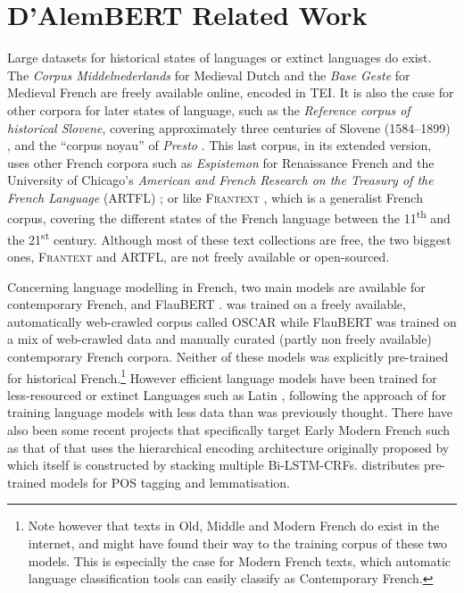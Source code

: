 \chapter{D'AlemBERT Related Work}


Large datasets for historical states of languages or  extinct languages do exist. The \emph{Corpus Middelnederlands} for Medieval Dutch \citep{reenen-etal-1998-corpus} and the \emph{Base Geste} for Medieval French \citep{camps-etal-2019-geste} are freely available online, encoded in TEI. It is also the case for other corpora for later states of language, such as the \emph{Reference corpus of historical Slovene}, covering approximately three centuries of Slovene (1584--1899)  \citep{erjavec-2015-reference}, and the ``corpus noyau'' of \emph{Presto} \citep{blumenthal-2018-presto}. This last corpus, in its extended version, uses other French corpora such as \emph{Espistemon} for Renaissance French \citep{demonet-1998-epistemon} and the University of Chicago's \emph{American and French Research on the Treasury of the French Language} (ARTFL) \citep{morrissey-olsen-1991-american}; or like \textsc{Frantext} \citep{atilf-1998-frantext}, which is a generalist French corpus, covering the different states of the French language between the 11\textsuperscript{th} and the 21\textsuperscript{st} century. Although most of these text collections are free, the two biggest ones, \textsc{Frantext} and ARTFL, are not freely available or open-sourced.

Concerning language modelling in French, two main models are available for contemporary French, \camembert \cite{martin-etal-2020-camembert} and FlauBERT \cite{le-etal-2020-flaubert}. \camembert was trained on a freely available, automatically web-crawled corpus called OSCAR \cite{ortiz-suarez-etal-2019-asynchronous,ortiz-suarez-etal-2020-monolingual} while FlauBERT was trained on a mix of web-crawled data and manually curated (partly non freely available) contemporary French corpora. Neither of these models was explicitly pre-trained for historical French.\footnote{Note however that texts in Old, Middle and Modern French do exist in the internet, and might have found their way to the training corpus of these two models. This is especially the case for Modern French texts, which automatic language classification tools can easily classify as Contemporary French.} However efficient language models have been trained for less-resourced or extinct Languages such as Latin \cite{bamman-burns-2020-latin}, following the approach of  for training language models with less data than was previously thought. There have also been some recent projects that specifically target Early Modern French such as that of \pieextended \cite{clerice-2020-pie} that uses the hierarchical encoding architecture originally proposed by  which itself is constructed by stacking multiple Bi-LSTM-CRFs.  distributes pre-trained models for POS tagging and lemmatisation.